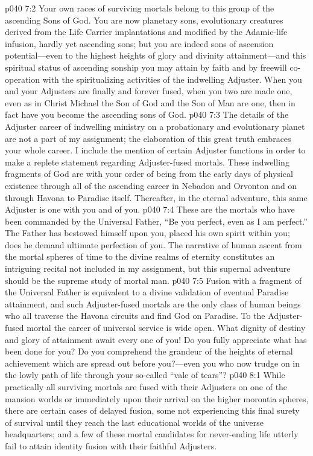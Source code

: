 \vs p040 7:2 Your own races of surviving mortals belong to this group of the ascending Sons of God. You are now planetary sons, evolutionary creatures derived from the Life Carrier implantations and modified by the Adamic\hyp{}life infusion, hardly yet ascending sons; but you are indeed sons of ascension potential---even to the highest heights of glory and divinity attainment---and this spiritual status of ascending sonship you may attain by faith and by freewill co\hyp{}operation with the spiritualizing activities of the indwelling Adjuster. When you and your Adjusters are finally and forever fused, when you two are made one, even as in Christ Michael the Son of God and the Son of Man are one, then in fact have you become the ascending sons of God.
\vs p040 7:3 The details of the Adjuster career of indwelling ministry on a probationary and evolutionary planet are not a part of my assignment; the elaboration of this great truth embraces your whole career. I include the mention of certain Adjuster functions in order to make a replete statement regarding Adjuster\hyp{}fused mortals. These indwelling fragments of God are with your order of being from the early days of physical existence through all of the ascending career in Nebadon and Orvonton and on through Havona to Paradise itself. Thereafter, in the eternal adventure, this same Adjuster is one with you and of you.
\vs p040 7:4 These are the mortals who have been commanded by the Universal Father, “Be you perfect, even as I am perfect.” The Father has bestowed himself upon you, placed his own spirit within you;  does he demand ultimate perfection of you. The narrative of human ascent from the mortal spheres of time to the divine realms of eternity constitutes an intriguing recital not included in my assignment, but this supernal adventure should be the supreme study of mortal man.
\vs p040 7:5 Fusion with a fragment of the Universal Father is equivalent to a divine validation of eventual Paradise attainment, and such Adjuster\hyp{}fused mortals are the only class of human beings who all traverse the Havona circuits and find God on Paradise. To the Adjuster\hyp{}fused mortal the career of universal service is wide open. What dignity of destiny and glory of attainment await every one of you! Do you fully appreciate what has been done for you? Do you comprehend the grandeur of the heights of eternal achievement which are spread out before you?---even you who now trudge on in the lowly path of life through your so\hyp{}called “vale of tears”?
\vs p040 8:1 While practically all surviving mortals are fused with their Adjusters on one of the mansion worlds or immediately upon their arrival on the higher morontia spheres, there are certain cases of delayed fusion, some not experiencing this final surety of survival until they reach the last educational worlds of the universe headquarters; and a few of these mortal candidates for never\hyp{}ending life utterly fail to attain identity fusion with their faithful Adjusters.
